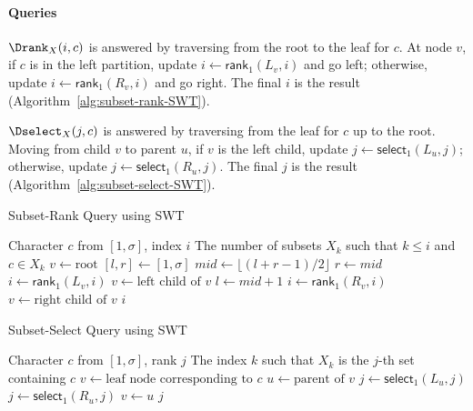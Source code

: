 \paragraph{Queries}
$\Drank_X(i, c)$ is answered by traversing from the root to the leaf for $c$. At node $v$, if $c$ is in the left partition, update $i \leftarrow \textsf{rank}_1(L_v, i)$ and go left; otherwise, update $i \leftarrow \textsf{rank}_1(R_v, i)$ and go right. The final $i$ is the result (Algorithm~\ref{alg:subset-rank-SWT}).

$\Dselect_X(j, c)$ is answered by traversing from the leaf for $c$ up to the root. Moving from child $v$ to parent $u$, if $v$ is the left child, update $j \leftarrow \textsf{select}_1(L_u, j)$; otherwise, update $j \leftarrow \textsf{select}_1(R_u, j)$. The final $j$ is the result (Algorithm~\ref{alg:subset-select-SWT}).


\begin{algorithm}[h]
    \caption{Subset-Rank Query using SWT {\cite{SubsetWT}}}
    \label{alg:subset-rank-SWT}
    \small
    \begin{algorithmic}[1] %
        \Require Character $c$ from $[1, \sigma]$, index $i$
        \Ensure The number of subsets $X_k$ such that $k \leq i$ and $c \in X_k$
        \State $v \gets \text{root}$
        \State $[l, r] \gets [1, \sigma]$
        \State $mid \gets \lfloor (l+r-1)/2 \rfloor$
        \State $r \gets mid$
        \State $i \gets \textsf{rank}_1(L_v, i)$
        \State $v \gets \text{left child of } v$
        \Else
        \State $l \gets mid + 1$
        \State $i \gets \textsf{rank}_1(R_v, i)$
        \State $v \gets \text{right child of } v$
        \EndIf
        \EndWhile
        \State \Return $i$
        \EndFunction
    \end{algorithmic}
\end{algorithm}

\begin{algorithm}[h]
    \caption{Subset-Select Query using SWT {\cite{SubsetWT}}}
    \label{alg:subset-select-SWT}
    \small
    \begin{algorithmic}[1] %
        \Require Character $c$ from $[1, \sigma]$, rank $j$
        \Ensure The index $k$ such that $X_k$ is the $j$-th set containing $c$
        \State $v \gets \text{leaf node corresponding to } c$
        \State $u \gets \text{parent of } v$
        \State $j \gets \textsf{select}_1(L_u, j)$
        \Else
        \State $j \gets \textsf{select}_1(R_u, j)$
        \EndIf
        \State $v \gets u$
        \EndWhile
        \State \Return $j$
        \EndFunction
    \end{algorithmic}
\end{algorithm}

